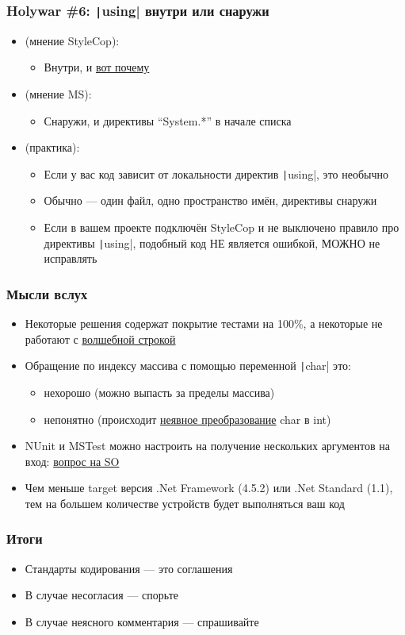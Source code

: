 \documentclass[xetex,mathserif,serif]{beamer}
\begin{document}
	\begin{frame}
		\frametitle{Holywar \#6: \texttt|using| внутри или снаружи}
		\begin{itemize}
			\item (мнение StyleCop):
			\begin{itemize}
				\item Внутри, и \href{https://stackoverflow.com/questions/125319/should-using-statements-be-inside-or-outside-the-namespace/151560\#151560}{вот почему}
			\end{itemize}
			\item (мнение MS):
			\begin{itemize}
				\item Снаружи, и директивы ``System.*'' в начале списка
			\end{itemize}
			\item (практика):
			\begin{itemize}
				\item Если у вас код зависит от локальности директив \texttt|using|, это необычно
				\item Обычно --- один файл, одно пространство имён, директивы снаружи
				\item Если в вашем проекте подключён StyleCop и не выключено правило про директивы \texttt|using|, подобный код НЕ является ошибкой, МОЖНО не исправлять
			\end{itemize}
		\end{itemize}
	\end{frame}

	\begin{frame}
		\frametitle{Мысли вслух}
		\begin{itemize}
			\item Некоторые решения содержат покрытие тестами на 100\%, а некоторые не работают с \href{https://blogs.msdn.microsoft.com/ericlippert/2011/07/12/what-curious-property-does-this-string-have/}{волшебной строкой}
			\item Обращение по индексу массива с помощью переменной \texttt|char| это:
			\begin{itemize}
				\item нехорошо (можно выпасть за пределы массива)
				\item непонятно (происходит \href{https://docs.microsoft.com/en-us/dotnet/csharp/language-reference/keywords/char\#conversions}{неявное преобразование} char в int)
			\end{itemize}
			\item NUnit и MSTest можно настроить на получение нескольких аргументов на вход: \href{https://stackoverflow.com/questions/9021881/how-to-run-a-test-method-with-multiple-parameters-in-mstest}{вопрос на SO}
			\item Чем меньше target версия .Net Framework (4.5.2) или .Net Standard (1.1), тем на большем количестве устройств будет выполняться ваш код
		\end{itemize}
	\end{frame}

	\begin{frame}
		\frametitle{Итоги}
		\begin{itemize}
			\item Стандарты кодирования --- это соглашения
			\item В случае несогласия --- спорьте
			\item В случае неясного комментария --- спрашивайте
		\end{itemize}
	\end{frame}
\end{document}
